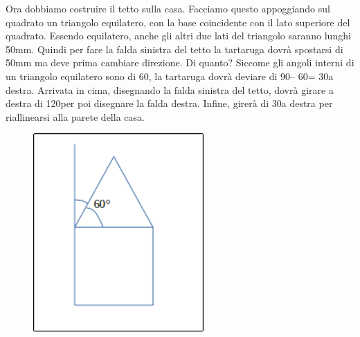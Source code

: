 \vskip 1cm

\begin{minipage}{0.45\textwidth}
Ora dobbiamo costruire il tetto sulla casa. Facciamo questo appoggiando sul quadrato un triangolo equilatero, con la base coincidente con il lato superiore del quadrato. Essendo equilatero, anche gli altri due lati del triangolo saranno lunghi 50mm. Quindi per fare la falda sinistra del tetto la tartaruga dovrà spostarsi di 50mm ma deve prima cambiare direzione. Di quanto? Siccome gli angoli interni di un triangolo equilatero sono di 60\degree, la tartaruga dovrà deviare di 90\degree – 60\degree = 30\degree a destra. Arrivata in cima, disegnando la falda sinistra del tetto, dovrà girare a destra di 120\degree per poi disegnare la falda destra. Infine, girerà di 30\degree a destra per riallinearsi alla parete della casa.
\end{minipage}
\begin{minipage}{0.5\textwidth}
\begin{figure}[H]
   \includegraphics[width=6.5cm,trim=4 4 8 4,clip]{./images/disegnare/disegnare-6.png}
   \label{dis-6}
\end{figure}
\end{minipage} \hfill

\vskip 1cm

